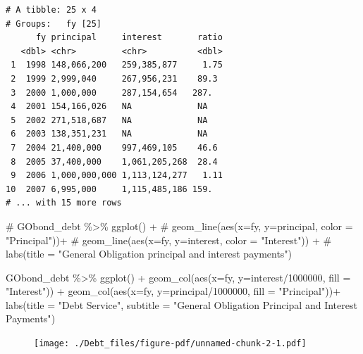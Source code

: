 \documentclass[
  letterpaper,
  DIV=11,
  numbers=noendperiod]{scrreport}
\newenvironment{Shaded}{\begin{snugshade}}{\end{snugshade}}
\newcommand{\AttributeTok}[1]{\textcolor[rgb]{0.40,0.45,0.13}{#1}}
\newcommand{\CommentTok}[1]{\textcolor[rgb]{0.37,0.37,0.37}{#1}}
\newcommand{\DecValTok}[1]{\textcolor[rgb]{0.68,0.00,0.00}{#1}}
\newcommand{\FunctionTok}[1]{\textcolor[rgb]{0.28,0.35,0.67}{#1}}
\newcommand{\NormalTok}[1]{\textcolor[rgb]{0.00,0.23,0.31}{#1}}
\newcommand{\SpecialCharTok}[1]{\textcolor[rgb]{0.37,0.37,0.37}{#1}}
\newcommand{\StringTok}[1]{\textcolor[rgb]{0.13,0.47,0.30}{#1}}
\begin{document}
\begin{verbatim}
# A tibble: 25 x 4
# Groups:   fy [25]
      fy principal     interest       ratio
   <dbl> <chr>         <chr>          <dbl>
 1  1998 148,066,200   259,385,877     1.75
 2  1999 2,999,040     267,956,231    89.3 
 3  2000 1,000,000     287,154,654   287.  
 4  2001 154,166,026   NA             NA   
 5  2002 271,518,687   NA             NA   
 6  2003 138,351,231   NA             NA   
 7  2004 21,400,000    997,469,105    46.6 
 8  2005 37,400,000    1,061,205,268  28.4 
 9  2006 1,000,000,000 1,113,124,277   1.11
10  2007 6,995,000     1,115,485,186 159.  
# ... with 15 more rows
\end{verbatim}

\begin{Shaded}
\begin{Highlighting}[]
\CommentTok{\# GObond\_debt \%\textgreater{}\% ggplot() + }
\CommentTok{\#   geom\_line(aes(x=fy, y=principal, color = "Principal"))+ }
\CommentTok{\#   geom\_line(aes(x=fy, y=interest, color = "Interest")) + }
\CommentTok{\#   labs(title = "General Obligation principal and interest payments")}



\NormalTok{GObond\_debt }\SpecialCharTok{\%\textgreater{}\%} 
  \FunctionTok{ggplot}\NormalTok{() }\SpecialCharTok{+}   
    \FunctionTok{geom\_col}\NormalTok{(}\FunctionTok{aes}\NormalTok{(}\AttributeTok{x=}\NormalTok{fy, }\AttributeTok{y=}\NormalTok{interest}\SpecialCharTok{/}\DecValTok{1000000}\NormalTok{, }\AttributeTok{fill =} \StringTok{"Interest"}\NormalTok{)) }\SpecialCharTok{+} 
    \FunctionTok{geom\_col}\NormalTok{(}\FunctionTok{aes}\NormalTok{(}\AttributeTok{x=}\NormalTok{fy, }\AttributeTok{y=}\NormalTok{principal}\SpecialCharTok{/}\DecValTok{1000000}\NormalTok{, }\AttributeTok{fill =} \StringTok{"Principal"}\NormalTok{))}\SpecialCharTok{+} 
    \FunctionTok{labs}\NormalTok{(}\AttributeTok{title =} \StringTok{"Debt Service"}\NormalTok{, }
         \AttributeTok{subtitle =} \StringTok{"General Obligation Principal and Interest Payments"}\NormalTok{)}
\end{Highlighting}
\end{Shaded}

\begin{figure}[H]

{\centering \texttt{[image: ./Debt\_files/figure-pdf/unnamed-chunk-2-1.pdf]}

}

\end{figure}
\end{document}
